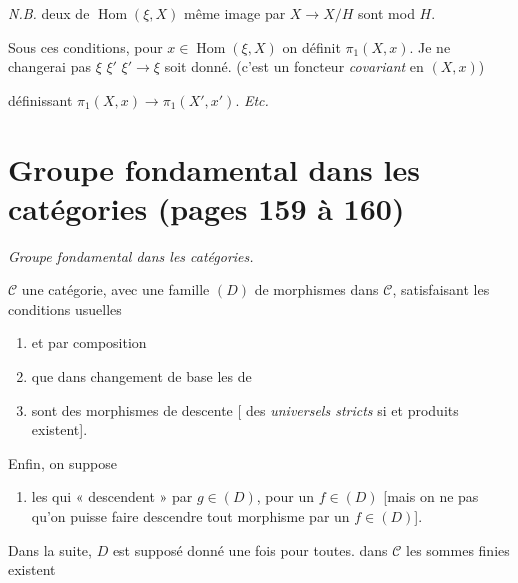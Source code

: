 \documentclass[11pt,a4paper]{article}
\begin{document}
\emph{N.B.} deux  de $\operatorname{Hom}(\xi, X)$ \ill{}
\ill{} même \ill{} image par $X \to X/H$ sont \ill{} mod $H$.

Sous ces conditions, pour $x \in \operatorname{Hom}(\xi, X)$ on définit
$\pi_1(X, x)$. Je ne changerai pas \struck{\ill{}} \ill{} \ill{} $\xi$
\struck{\ill{}} \ill{} $\xi'$ \ill{} $\xi' \to \xi$ soit donné.
(c'est un foncteur \emph{covariant} en $(X, x)$)


définissant $\pi_1(X, x) \to \pi_1(X', x')$. \emph{Etc.}

\section*{Groupe fondamental dans les catégories (pages 159 à 160)}


\emph{Groupe fondamental dans les catégories.}

$\mathcal{C}$ une catégorie, avec une famille $(D)$ de morphismes
dans $\mathcal{C}$, satisfaisant les conditions usuelles
\begin{enumerate}
\item[(i)]  et  par
composition
\item[(ii)] \ill{} que dans \ill{} changement de base 
\ill{} les \ill{} de \ill{}
\item[(iii)] \struck{\ill{}} \ill{} sont des morphismes de descente
[\ill{} des \ill{} \emph{universels stricts} si \ill{} \ill{} et \ill{}
\ill{} produits existent].
\end{enumerate}

Enfin, on suppose
\begin{enumerate}
\item[(iv)] les  qui « descendent » par $g \in (D)$,
pour un $f \in (D)$ [mais on ne  pas qu'on puisse faire
descendre tout morphisme par un $f \in (D)$].
\end{enumerate}


Dans la suite, $D$ est supposé donné une fois pour toutes.
\ill{} dans $\mathcal{C}$ les sommes finies 
existent \ill{}
\end{document}
